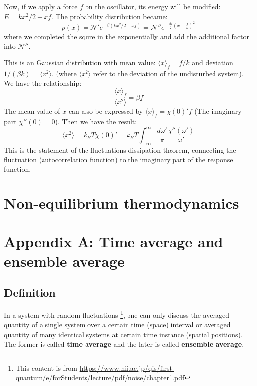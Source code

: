 \documentclass{article}
\begin{document}
Now, if we apply a force $f$ on the oscillator, its energy will be modified:
$E = kx^2/2 - xf$. The probability distribution became:
\begin{equation}
    p(x) = \mathcal{N}' e^{-\beta(kx^2/2 - xf)} = \mathcal{N}'' e^{-\frac{\beta k}{2} (x - \frac{f}{k})^2 }
\end{equation}
where we completed the squre in the exponentially and add the additional 
factor into $\mathcal{N}''$. 

This is an Gaussian distribution with mean value: $\langle x \rangle_f = f/k$ and 
deviation $1/(\beta k) = \langle x^2 \rangle$. (where $\langle x^2 \rangle$ refer to the 
deviation of the undisturbed system). 
We have the relationship:
\begin{equation}
    \frac{\langle x \rangle_f}{\langle x^2 \rangle} = \beta f
\end{equation}
The mean value of $x$ can also be expressed by $\langle x \rangle_f = \chi(0)' f $
(The imaginary part $\chi''(0) = 0$). Then we have the result:
\begin{equation}
    \langle x^2 \rangle = k_B T \chi(0)' = 
    k_BT\int_{-\infty}^{\infty} \frac{d\omega'}{\pi} \frac{\chi''(\omega')}{\omega'} 
\end{equation}
This is the statement of the fluctuations dissipation theorem, connecting the 
fluctuation (autocorrelation function) to the imaginary part of the response function.

\section{Non-equilibrium thermodynamics}


\pagebreak
\section*{Appendix A: Time average and ensemble average}
\subsection*{Definition}
In a system with random fluctuations
\footnote{This content is from \url{https://www.nii.ac.jp/qis/first-quantum/e/forStudents/lecture/pdf/noise/chapter1.pdf}}, 
one can only discuss the averaged quantity of a single system over a certain
time (space) interval or averaged quantity of many identical systems at certain 
time instance (spatial positions). The former is called \textbf{time average} and 
the later is called \textbf{ensemble average}. 
\end{document}
